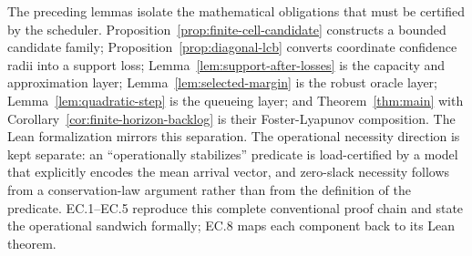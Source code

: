 \documentclass[opre,dblanonrev]{informs4}
\begin{document}
The preceding lemmas isolate the mathematical obligations that must be certified
by the scheduler.  Proposition~\ref{prop:finite-cell-candidate} constructs a
bounded candidate family; Proposition~\ref{prop:diagonal-lcb} converts
coordinate confidence radii into a support loss;
Lemma~\ref{lem:support-after-losses} is the capacity and approximation layer;
Lemma~\ref{lem:selected-margin} is the robust oracle layer;
Lemma~\ref{lem:quadratic-step} is the queueing layer; and
Theorem~\ref{thm:main} with
Corollary~\ref{cor:finite-horizon-backlog} is their Foster-Lyapunov composition.
The Lean formalization mirrors this separation.  The operational necessity direction is
kept separate: an ``operationally stabilizes'' predicate is load-certified by a
model that explicitly encodes the mean arrival vector, and zero-slack necessity
follows from a conservation-law argument rather than from the definition of the
predicate.  EC.1--EC.5 reproduce this complete conventional proof chain and
state the operational sandwich formally; EC.8 maps each component back to its
Lean theorem.
\end{document}
